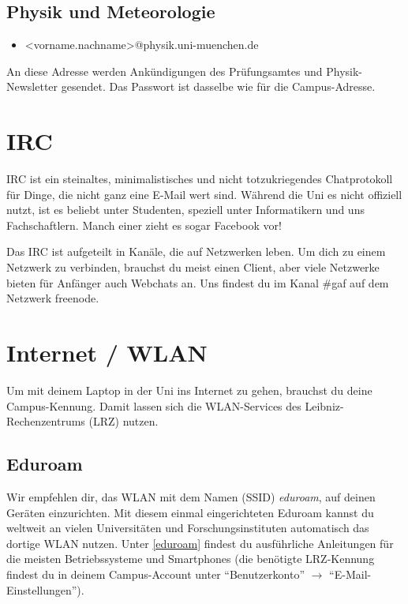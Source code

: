 \subsection*{Physik und Meteorologie\subjectList{\subjectP}}
\begin{itemize}
	\item[]<vorname.nachname>@physik.uni-muenchen.de
\end{itemize}
An diese Adresse werden Ankündigungen des Prüfungsamtes und Physik-Newsletter gesendet.
Das Passwort ist dasselbe wie für die Campus-Adresse.

\begin{urlList}
\end{urlList}

\section{IRC}
IRC ist ein steinaltes, minimalistisches und nicht totzukriegendes
Chatprotokoll für Dinge, die nicht ganz eine E-Mail wert sind. Während die Uni
es nicht offiziell nutzt, ist es beliebt unter Studenten, speziell unter
Informatikern und uns Fachschaftlern. Manch einer zieht es sogar Facebook vor!

Das IRC ist aufgeteilt in Kanäle, die auf Netzwerken leben. Um dich zu einem
Netzwerk zu verbinden, brauchst du meist einen Client, aber viele Netzwerke
bieten für Anfänger auch Webchats an. Uns findest du im Kanal \#gaf auf dem
Netzwerk freenode.

\begin{urlList}
\end{urlList}



\section{Internet / WLAN}
Um mit deinem Laptop in der Uni ins Internet zu gehen, brauchst du
deine Campus-Kennung. Damit lassen sich die WLAN-Services des
Leibniz-Rechen\-zentrums (LRZ) nutzen.

\subsection*{Eduroam}
Wir empfehlen dir, das WLAN mit dem Namen (SSID) \emph{eduroam}, auf deinen Geräten einzurichten. Mit diesem einmal eingerichteten Eduroam kannst du weltweit an vielen Universitäten und Forschungsinstituten automatisch das dortige WLAN nutzen. Unter \ref{eduroam} findest du ausführliche Anleitungen für die meisten Betriebssysteme und Smart\-phones 
(die benötigte LRZ-Kennung findest du in deinem Campus-Account unter \enquote{Benutzerkonto} $\rightarrow$ \enquote{E-Mail-Einstellungen}).

